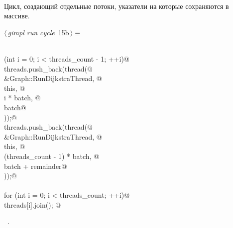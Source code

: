 \documentclass[12pt]{article}
\begin{document}
\paragraph{}
Цикл, создающий отдельные потоки, указатели на которые сохраняются в массиве.
\begin{flushleft} \small
\begin{minipage}{\linewidth}\label{scrap29}\raggedright\small
{} $\langle\,${\itshape gimpl run cycle}\nobreak\ {\footnotesize {15b}}$\,\rangle\equiv$
\vspace{-1ex}
\begin{list}{}{} \item
\mbox{}\verb@@\\
\mbox{}\verb@for (int i = 0; i < threads_count - 1; ++i)@\\
\mbox{}\verb@        threads.push_back(thread(@\\
\mbox{}\verb@          &Graph::RunDijkstraThread, @\\
\mbox{}\verb@          this, @\\
\mbox{}\verb@          i * batch, @\\
\mbox{}\verb@          batch@\\
\mbox{}\verb@        ));@\\
\mbox{}\verb@    threads.push_back(thread(@\\
\mbox{}\verb@        &Graph::RunDijkstraThread, @\\
\mbox{}\verb@        this, @\\
\mbox{}\verb@        (threads_count - 1) * batch, @\\
\mbox{}\verb@        batch + remainder@\\
\mbox{}\verb@      ));@\\
\mbox{}\verb@@\\
\mbox{}\verb@  for (int i = 0; i < threads_count; ++i)@\\
\mbox{}\verb@        threads[i].join(); @\\
\mbox{}\verb@@{\NWsep}
\end{list}
\vspace{-1.5ex}
\footnotesize
\begin{list}{}{\setlength{\itemsep}{-\parsep}\setlength{\itemindent}{-\leftmargin}}
\item \NWtxtMacroRefIn\ .

\item{}
\end{list}
\end{minipage}\vspace{4ex}
\end{flushleft}
\end{document}
